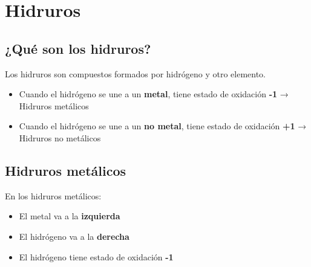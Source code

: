 %


\section{Hidruros}

\subsection{¿Qué son los hidruros?}

Los hidruros son compuestos formados por hidrógeno y otro elemento.

\begin{itemize}
    \item Cuando el hidrógeno se une a un \textbf{metal}, tiene estado de oxidación \textbf{-1} → Hidruros metálicos
    \item Cuando el hidrógeno se une a un \textbf{no metal}, tiene estado de oxidación \textbf{+1} → Hidruros no metálicos
\end{itemize}

\subsection{Hidruros metálicos}

En los hidruros metálicos:
\begin{itemize}
    \item El metal va a la \textbf{izquierda}
    \item El hidrógeno va a la \textbf{derecha}
    \item El hidrógeno tiene estado de oxidación \textbf{-1}
\end{itemize}

